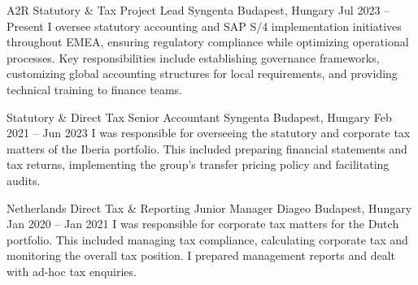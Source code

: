 


\begin{cventries}


  \cventry
    {A2R Statutory \& Tax Project Lead} %
    {Syngenta} %
    {Budapest, Hungary} %
    {Jul 2023 -- Present} %
    {I oversee statutory accounting and SAP S/4 implementation initiatives throughout EMEA, ensuring regulatory compliance while optimizing operational processes. Key responsibilities include establishing governance frameworks, customizing global accounting structures for local requirements, and providing technical training to finance teams.} %
    {} %


  \cventry
    {Statutory \& Direct Tax Senior Accountant} %
    {Syngenta} %
    {Budapest, Hungary} %
    {Feb 2021 -- Jun 2023} %
    {I was responsible for overseeing the statutory and corporate tax matters of the Iberia portfolio. This included preparing financial statements and tax returns, implementing the group's transfer pricing policy and facilitating audits.} %
    {} %


  \cventry
    {Netherlands Direct Tax \& Reporting Junior Manager} %
    {Diageo} %
    {Budapest, Hungary} %
    {Jan 2020 -- Jan 2021} %
    {I was responsible for corporate tax matters for the Dutch portfolio. This included managing tax compliance, calculating corporate tax and monitoring the overall tax position. I prepared management reports and dealt with ad-hoc tax enquiries.} %
    {} %



\end{cventries}
